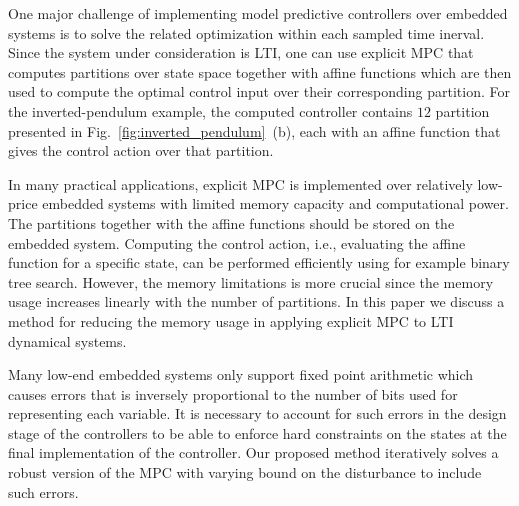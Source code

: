 	One major challenge of implementing model predictive controllers over embedded systems is to solve the related optimization within each sampled time inerval. Since the system under consideration is LTI, one can use explicit MPC \cite{Bemporad:2002} that computes partitions over state space together with affine functions which are then used to compute the optimal control input over their corresponding partition. For the inverted-pendulum example, the computed controller contains $12$ partition presented in Fig.~\ref{fig:inverted_pendulum}~{(b)}, each with an affine function that gives the control action over that partition.
	
	In many practical applications, explicit MPC is implemented over relatively low-price embedded systems with limited memory capacity and computational power. The partitions together with the affine functions should be stored on the embedded system.
	Computing the control action, i.e., evaluating the affine function for a specific state, can be performed efficiently using for example binary tree search. However, the memory limitations is more crucial since the memory usage increases linearly with the number of partitions.
	In this paper we discuss a method for reducing the memory usage in applying explicit MPC to LTI dynamical systems.
	
	Many low-end embedded systems only support fixed point arithmetic which causes errors that is inversely proportional to the number of bits used for representing each variable. It is necessary to account for such errors in the design stage of the controllers to be able to enforce hard constraints on the states at the final implementation of the controller. Our proposed method iteratively solves a robust version of the MPC with varying bound on the disturbance to include such errors.   %
	
